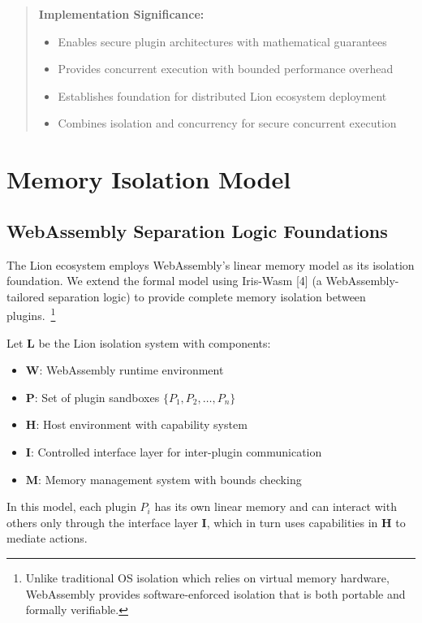 \begin{abstract}
\vspace{0.3cm}

\textbf{Implementation Significance:}
\begin{itemize}
\item Enables secure plugin architectures with mathematical guarantees
\item Provides concurrent execution with bounded performance overhead
\item Establishes foundation for distributed Lion ecosystem deployment  
\item Combines isolation and concurrency for secure concurrent execution
\end{itemize}
\end{abstract}

\vspace{0.5cm}

\tableofcontents

\newpage

\section{Memory Isolation Model}

\subsection{WebAssembly Separation Logic Foundations}

The Lion ecosystem employs WebAssembly's linear memory model as its isolation foundation. We extend the formal model using Iris-Wasm [4] (a WebAssembly-tailored separation logic) to provide complete memory isolation between plugins.~\footnote{Unlike traditional OS isolation which relies on virtual memory hardware, WebAssembly provides software-enforced isolation that is both portable and formally verifiable.}

\begin{definition}
Let $\mathbf{L}$ be the Lion isolation system with components:
\begin{itemize}
\item $\mathbf{W}$: WebAssembly runtime environment
\item $\mathbf{P}$: Set of plugin sandboxes $\{P_1, P_2, \ldots, P_n\}$
\item $\mathbf{H}$: Host environment with capability system
\item $\mathbf{I}$: Controlled interface layer for inter-plugin communication
\item $\mathbf{M}$: Memory management system with bounds checking
\end{itemize}

In this model, each plugin $P_i$ has its own linear memory and can interact with others only through the interface layer $\mathbf{I}$, which in turn uses capabilities in $\mathbf{H}$ to mediate actions.
\end{definition}

